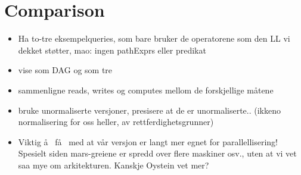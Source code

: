 \section{Comparison}
\label{sect:results:comparison}
\begin{itemize}
  \item Ha to-tre eksempelqueries, som bare bruker de operatorene som den LL vi dekket st\o tter, mao: ingen
  pathExprs eller predikat
  \item vise som DAG og som tre
  \item sammenligne reads, writes og computes mellom de forskjellige m\aa tene
  \item bruke unormaliserte versjoner, presisere at de er unormaliserte.. (ikkeno normalisering for oss heller, av
  rettferdighetsgrunner)
  \item Viktig \aa~ f\aa~ med at v\aa r versjon er langt mer egnet for
  parallellisering! Spesielt siden mars-greiene er spredd over flere maskiner
  osv., uten at vi vet saa mye om arkitekturen. Kanskje Oystein vet mer?
  \end{itemize}